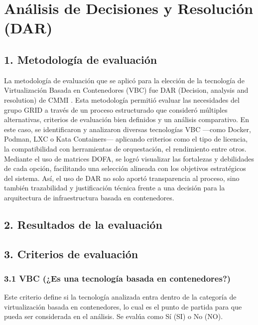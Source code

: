 \chapter*{Análisis de Decisiones y Resolución (DAR)}
\label{cap:dar}

\section*{1. Metodología de evaluación}

La metodología de evaluación que se aplicó para la elección de la tecnología de Virtualización Basada en Contenedores (VBC) fue DAR (Decision, analysis and resolution) de CMMI \citep{CMMIInstitute2010}. Esta metodología permitió evaluar las necesidades del grupo GRID a través de un proceso estructurado que consideró múltiples alternativas, criterios de evaluación bien definidos y un análisis comparativo. En este caso, se identificaron y analizaron diversas tecnologías VBC —como Docker, Podman, LXC o Kata Containers— aplicando criterios como el tipo de licencia, la compatibilidad con herramientas de orquestación, el rendimiento entre otros. Mediante el uso de matrices DOFA, se logró visualizar las fortalezas y debilidades de cada opción, facilitando una selección alineada con los objetivos estratégicos del sistema. Así, el uso de DAR no solo aportó transparencia al proceso, sino también trazabilidad y justificación técnica frente a una decisión para la arquitectura de infraestructura basada en contenedores.

\section*{2. Resultados de la evaluación}



\section*{3. Criterios de evaluación}

\subsection*{3.1 VBC (¿Es una tecnología basada en contenedores?)}
Este criterio define si la tecnología analizada entra dentro de la categoría de virtualización basada en contenedores, lo cual es el punto de partida para que pueda ser considerada en el análisis. Se evalúa como Sí (SI) o No (NO).

